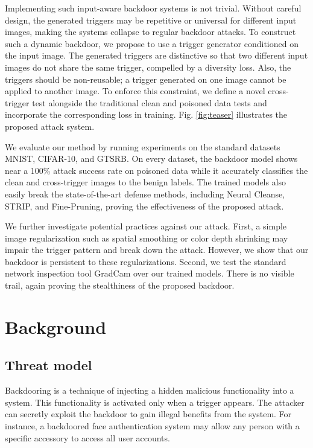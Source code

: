 \documentclass{article}
\begin{document}
Implementing such input-aware backdoor systems is not trivial. Without careful design, the generated triggers may be repetitive or universal for different input images, making the systems collapse to regular backdoor attacks. To construct such a dynamic backdoor, we propose to use a trigger generator conditioned on the input image. The generated triggers are distinctive so that two different input images do not share the same trigger, compelled by a diversity loss. Also, the triggers should be non-reusable; a trigger generated on one image cannot be applied to another image. To enforce this constraint, we define a novel cross-trigger test alongside the traditional clean and poisoned data tests and incorporate the corresponding loss in training. Fig. \ref{fig:teaser} illustrates the proposed attack system.

We evaluate our method by running experiments on the standard datasets MNIST, CIFAR-10, and GTSRB. On every dataset, the backdoor model shows near a 100\% attack success rate on poisoned data while it accurately classifies the clean and cross-trigger images to the benign labels. The trained models also easily break the state-of-the-art defense methods, including Neural Cleanse, STRIP, and Fine-Pruning, proving the effectiveness of the proposed attack.

We further investigate potential practices against our attack. First, a simple image regularization such as spatial smoothing or color depth shrinking may impair the trigger pattern and break down the attack. However, we show that our backdoor is persistent to these regularizations. Second, we test the standard network inspection tool GradCam \cite{selvaraju2017grad} over our trained models. There is no visible trail, again proving the stealthiness of the proposed backdoor.

\section{Background}
\subsection{Threat model}
Backdooring is a technique of injecting a hidden malicious functionality into a system. This functionality is activated only when a trigger appears. The attacker can secretly exploit the backdoor to gain illegal benefits from the system. For instance, a backdoored face authentication system may allow any person with a specific accessory to access all user accounts.
\end{document}
